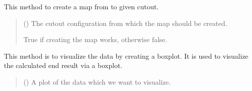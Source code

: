 \documentclass[letterpaper,10pt,english]{sphinxmanual}
\begin{document}
\begin{fulllineitems}
\begin{fulllineitems}
\label{\detokenize{apidoc/src.osm_configurator.model.application:src.osm_configurator.model.application.application_interface.IApplication.create_map}}
\pysigstartsignatures
{}
\pysigstopsignatures
\sphinxAtStartPar
This method to create a map from to given cut\sphinxhyphen{}out.
\begin{quote}\begin{description}
\sphinxAtStartPar
{} ({\hyperref[\detokenize{apidoc/src.osm_configurator.model.project.configuration:src.osm_configurator.model.project.configuration.cut_out_configuration.CutOutConfiguration}]{}}) \textendash{} The cut\sphinxhyphen{}out configuration from which the map should be created.

\sphinxAtStartPar
True if creating the map works, otherwise false.

\sphinxAtStartPar
{}

\end{description}\end{quote}

\end{fulllineitems}


\begin{fulllineitems}
\label{\detokenize{apidoc/src.osm_configurator.model.application:src.osm_configurator.model.application.application_interface.IApplication.create_boxplot}}
\pysigstartsignatures
{}
\pysigstopsignatures
\sphinxAtStartPar
This method is to visualize the data by creating a boxplot.
It is used to visualize the calculated end result via a boxplot.
\begin{quote}\begin{description}
\sphinxAtStartPar
{} () \textendash{} A plot of the data which we want to visualize.


\end{description}
\end{quote}
\end{fulllineitems}
\end{fulllineitems}
\end{document}
